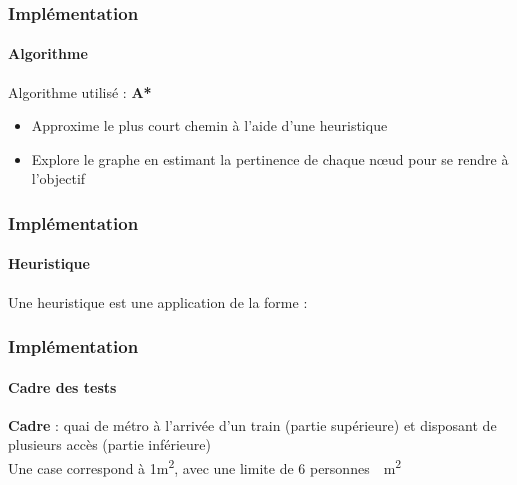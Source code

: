 \begin{frame}
    \frametitle{Implémentation}
    \framesubtitle{Algorithme}
    Algorithme utilisé : \bigskip
    \textbf{A*}
    \begin{itemize}
        \item <2-> Approxime le plus court chemin à l'aide d'une heuristique
        \item <3-> Explore le graphe en estimant la pertinence de chaque nœud pour se rendre à l'objectif
    \end{itemize}
\end{frame}


\begin{frame}
    \frametitle{Implémentation}
    \framesubtitle{Heuristique}
    Une heuristique est une application de la forme :
\end{frame}


\begin{frame}
    \frametitle{Implémentation}
    \framesubtitle{Cadre des tests}
    \textbf{Cadre} : quai de métro à l'arrivée d'un train (partie supérieure) et disposant de plusieurs accès (partie inférieure) \\[.3cm]
     Une case correspond à \num{1}\si{\metre \squared}, avec une limite de 6 \si{personnes \per \metre \squared}
\end{frame}


